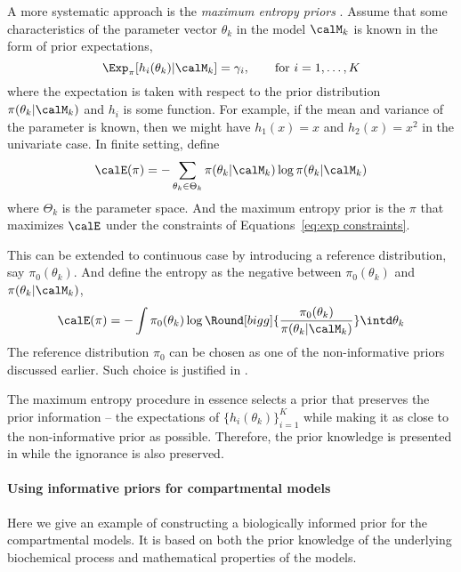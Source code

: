 A more systematic approach is the \emph{maximum entropy priors}
\cite{Jaynes:1989vx}. Assume that some characteristics of the parameter vector
$\theta_k$ in the model $\calM_k$ is known in the form of prior expectations,
\begin{equation}
  \Exp_{\pi}[h_i(\theta_k)|\calM_k] = \gamma_i, \qquad\text{for } i =
  1,\dots,K
  \label{eq:exp constraints}
\end{equation}
where the expectation is taken with respect to the prior distribution
$\pi(\theta_k|\calM_k)$ and $h_i$ is some function. For example, if the mean
and variance of the parameter is known, then we might have $h_1(x) = x$ and
$h_2(x) = x^2$ in the univariate case. In finite setting, define
\begin{equation}
  \calE(\pi) = -\sum_{\theta_k\in\Theta_k}
  \pi(\theta_k|\calM_k)\log \pi (\theta_k|\calM_k)
\end{equation}
where $\Theta_k$ is the parameter space. And the maximum entropy prior is the
$\pi$ that maximizes $\calE$ under the constraints of Equations~\eqref{eq:exp
  constraints}.

This can be extended to continuous case by introducing a reference
distribution, say $\pi_0(\theta_k)$. And define the entropy as the negative
\kld between $\pi_0(\theta_k)$ and $\pi(\theta_k|\calM_k)$,
\begin{equation}
  \calE(\pi) = -\int \pi_0(\theta_k)\log\Round[bigg]{
    \frac{\pi_0(\theta_k)}{\pi(\theta_k|\calM_k)}}\intd\theta_k
\end{equation}
The reference distribution $\pi_0$ can be chosen as one of the non-informative
priors discussed earlier. Such choice is justified in
\cite[][chap.~9]{Robert:2007tc}.

The maximum entropy procedure in essence selects a prior that preserves the
prior information -- the expectations of $\{h_i(\theta_k)\}_{i=1}^K$ while
making it as close to the non-informative prior as possible. Therefore, the
prior knowledge is presented in while the ignorance is also preserved.

\paragraph{Using informative priors for \pet compartmental models}

Here we give an example of constructing a biologically informed prior for the
\pet compartmental models. It is based on both the prior knowledge of the
underlying biochemical process and mathematical properties of the models.

